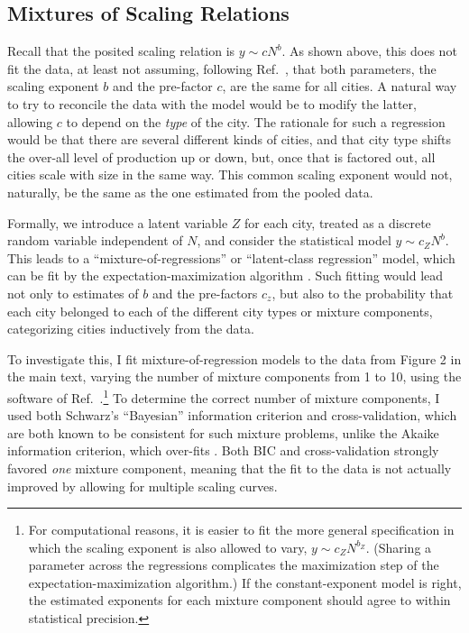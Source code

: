 \documentclass{pnastwo}
\begin{document}
\begin{article}
\section{Mixtures of Scaling Relations}
\label{sec:mixture-of-regressions}

Recall that the posited scaling relation is $y \sim cN^b$.  As shown above,
this does not fit the data, at least not assuming, following Ref.\
\cite{Bettencout-et-al-growth-innovation-scaling}, that both parameters, the
scaling exponent $b$ and the pre-factor $c$, are the same for all cities.  A
natural way to try to reconcile the data with the model would be to modify the
latter, allowing $c$ to depend on the {\em type} of the city.  The rationale
for such a regression would be that there are several different kinds of
cities, and that city type shifts the over-all level of production up or down,
but, once that is factored out, all cities scale with size in the same way.
This common scaling exponent would not, naturally, be the same as the one
estimated from the pooled data.

Formally, we introduce a latent variable $Z$ for each city, treated as a
discrete random variable independent of $N$, and consider the statistical model
$y \sim c_Z N^b$.  This leads to a ``mixture-of-regressions'' or ``latent-class
regression'' model, which can be fit by the expectation-maximization algorithm
\cite{Benaglia-et-al-mixtools}.  Such fitting would lead not only to estimates
of $b$ and the pre-factors $c_z$, but also to the probability that each city
belonged to each of the different city types or mixture components,
categorizing cities inductively from the data.

To investigate this, I fit mixture-of-regression models to the data from Figure
2 in the main text, varying the number of mixture components from 1 to 10,
using the software of Ref.\ \cite{Benaglia-et-al-mixtools}.\footnote{For
  computational reasons, it is easier to fit the more general specification in
  which the scaling exponent is also allowed to vary, $y \sim c_Z N^{b_Z}$.
  (Sharing a parameter across the regressions complicates the maximization step
  of the expectation-maximization algorithm.)  If the constant-exponent model
  is right, the estimated exponents for each mixture component should agree to
  within statistical precision.}  To determine the correct number of mixture
components, I used both Schwarz's ``Bayesian'' information criterion and
cross-validation, which are both known to be consistent for such mixture
problems, unlike the Akaike information criterion, which over-fits
\cite{Claeskens-Hjort-model-selection}.  Both BIC and cross-validation strongly
favored {\em one} mixture component, meaning that the fit to the data is not
actually improved by allowing for multiple scaling curves.


\end{article}
\end{document}
